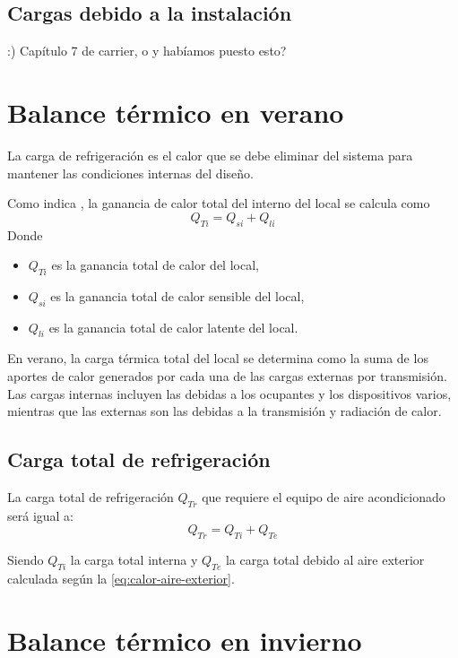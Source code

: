 \subsection{Cargas debido a la instalación}
:) Capítulo 7 de carrier, o y habíamos puesto esto?

\section{Balance térmico en verano}\label{sec:balance-verano}
La carga de refrigeración es el calor que se debe eliminar del sistema para mantener las condiciones internas del diseño. 

Como indica \textcite{quadri2020}, la ganancia de calor total del interno del local se calcula como
\begin{equation}
	Q_{Ti} = Q_{si} + Q_{li}
\end{equation}
Donde
\begin{itemize}
	\item $Q_{Ti}$ es la ganancia total de calor del local,
	\item $Q_{si}$ es la ganancia total de calor sensible del local,
	\item $Q_{li}$ es la ganancia total de calor latente del local.
\end{itemize}

En verano, la carga térmica total del local se determina como la suma de los aportes de calor generados por cada una de las cargas externas por transmisión. Las cargas internas incluyen las debidas a los ocupantes y los dispositivos varios, mientras que las externas son las debidas a la transmisión y radiación de calor.

\subsection{Carga total de refrigeración}

La carga total de refrigeración $Q_{Tr}$ que requiere el equipo de aire acondicionado será igual a:
\begin{equation}
	Q_{Tr} = Q_{Ti} + Q_{Te}
\end{equation}

Siendo $Q_{Ti}$ la carga total interna y $Q_{Te}$ la carga total debido al aire exterior calculada según la \autoref{eq:calor-aire-exterior}.

\section{Balance térmico en invierno}

